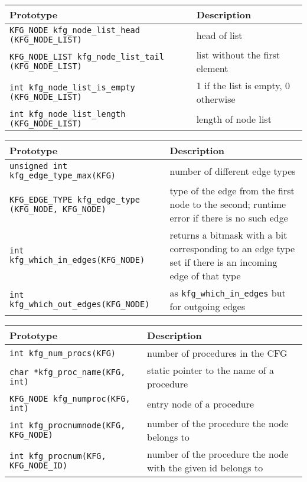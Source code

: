 \documentclass[12pt]{article}
\begin{document}
\begin{longtable}{|p{} | p{}|}
\hline
Prototype & Description \\
\hline
\hline \endhead
\verb|KFG_NODE kfg_node_list_head| \verb|(KFG_NODE_LIST)|
    & head of list \\
\hline
\verb|KFG_NODE_LIST kfg_node_list_tail| \verb|(KFG_NODE_LIST)|
    & list without the first element \\
\hline
\verb|int kfg_node_list_is_empty| \verb|(KFG_NODE_LIST)|
    & 1 if the list is empty, 0 otherwise \\
\hline
\verb|int kfg_node_list_length| \verb|(KFG_NODE_LIST)|
    & length of node list \\
\hline
\end{longtable}

\begin{longtable}{|p{} | p{}|}
\hline
Prototype & Description \\
\hline
\hline \endhead
\verb|unsigned int kfg_edge_type_max(KFG)|
    & number of different edge types \\
\hline
\verb|KFG_EDGE_TYPE kfg_edge_type| \verb|(KFG_NODE, KFG_NODE)|
    & type of the edge from the first node to the second; runtime error
      if there is no such edge \\
\hline
\verb|int kfg_which_in_edges(KFG_NODE)|
    & returns a bitmask with a bit corresponding to an edge type set
      if there is an incoming edge of that type \\
\hline
\verb|int kfg_which_out_edges(KFG_NODE)|
    & as \verb|kfg_which_in_edges| but for outgoing edges \\
\hline
\end{longtable}

\begin{longtable}{|p{} | p{}|}
\hline
Prototype & Description \\
\hline
\hline \endhead
\verb|int kfg_num_procs(KFG)|
    & number of procedures in the CFG \\
\hline
\verb|char *kfg_proc_name(KFG, int)|
    & static pointer to the name of a procedure \\
\hline
\verb|KFG_NODE kfg_numproc(KFG, int)|
    & entry node of a procedure \\
\hline
\verb|int kfg_procnumnode(KFG, KFG_NODE)|
    & number of the procedure the node belongs to \\
\hline
\verb|int kfg_procnum(KFG, KFG_NODE_ID)|
    & number of the procedure the node with the given id belongs to \\
\hline
\end{longtable}
\end{document}
